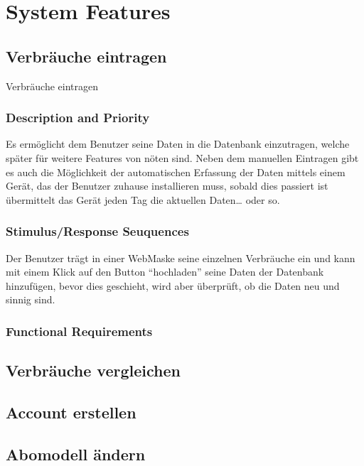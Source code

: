\section{System Features}
\subsection{Verbräuche eintragen}
Verbräuche eintragen
\subsubsection{Description and Priority}
Es ermöglicht dem Benutzer seine Daten in die Datenbank einzutragen, welche später für weitere Features von nöten sind. Neben dem manuellen Eintragen gibt es auch die Möglichkeit der automatischen Erfassung der Daten mittels einem Gerät, das der Benutzer zuhause installieren muss, sobald dies passiert ist übermittelt das Gerät jeden Tag die aktuellen Daten… oder so.
\subsubsection{Stimulus/Response Seuquences}
Der Benutzer trägt in einer WebMaske seine einzelnen Verbräuche ein und kann mit einem Klick auf den Button “hochladen” seine Daten der Datenbank hinzufügen, bevor dies geschieht, wird aber überprüft, ob die Daten neu und sinnig sind.
\subsubsection{Functional Requirements}
\subsection{Verbräuche vergleichen}
\subsection{Account erstellen}
\subsection{Abomodell ändern}